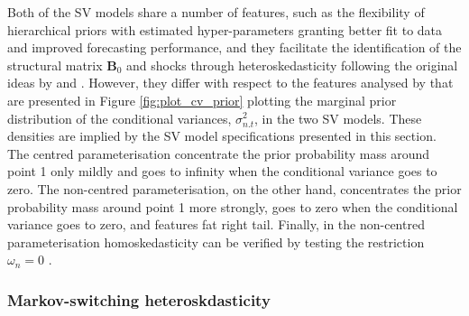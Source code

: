 \documentclass[
  nojss]{jss}
\begin{document}
Both of the SV models share a number of features, such as the
flexibility of hierarchical priors with estimated hyper-parameters
granting better fit to data and improved forecasting performance, and
they facilitate the identification of the structural matrix
\(\mathbf{B}_0\) and shocks through heteroskedasticity following the
original ideas by \cite{bertsche2022identification} and
\cite{lewis_identifying_2021}. However, they differ with respect to the
features analysed by \cite{LSUW2024} that are presented in Figure
\ref{fig:plot_cv_prior} plotting the marginal prior distribution of the
conditional variances, \(\sigma_{n.t}^2\), in the two SV models. These
densities are implied by the SV model specifications presented in this
section. The centred parameterisation concentrate the prior probability
mass around point 1 only mildly and goes to infinity when the
conditional variance goes to zero. The non-centred parameterisation, on
the other hand, concentrates the prior probability mass around point 1
more strongly, goes to zero when the conditional variance goes to zero,
and features fat right tail. Finally, in the non-centred
parameterisation homoskedasticity can be verified by testing the
restriction \(\omega_n = 0\) \citep[see][]{LSUW2024}.

\subsubsection{Markov-switching heteroskdasticity}
\end{document}
